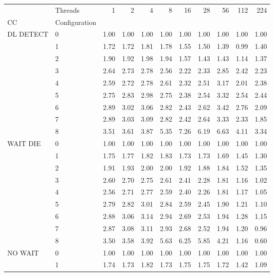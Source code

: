 \begin{tabular}{llrrrrrrrrr}
\toprule
       & Threads &  1   &  2   &  4   &  8   &  16  &  28  &  56  &  112 &  224 \\
CC & Configuration &      &      &      &      &      &      &      &      &      \\
\midrule
DL DETECT & 0 & 1.00 & 1.00 & 1.00 & 1.00 & 1.00 & 1.00 & 1.00 & 1.00 & 1.00 \\
       & 1 & 1.72 & 1.72 & 1.81 & 1.78 & 1.55 & 1.50 & 1.39 & 0.99 & 1.40 \\
       & 2 & 1.90 & 1.92 & 1.98 & 1.94 & 1.57 & 1.43 & 1.43 & 1.14 & 1.37 \\
       & 3 & 2.64 & 2.73 & 2.78 & 2.56 & 2.22 & 2.33 & 2.85 & 2.42 & 2.23 \\
       & 4 & 2.59 & 2.72 & 2.78 & 2.61 & 2.32 & 2.51 & 3.17 & 2.01 & 2.38 \\
       & 5 & 2.75 & 2.83 & 2.98 & 2.75 & 2.38 & 2.54 & 3.32 & 2.54 & 2.44 \\
       & 6 & 2.89 & 3.02 & 3.06 & 2.82 & 2.43 & 2.62 & 3.42 & 2.76 & 2.09 \\
       & 7 & 2.89 & 3.03 & 3.09 & 2.82 & 2.42 & 2.64 & 3.33 & 2.33 & 1.85 \\
       & 8 & 3.51 & 3.61 & 3.87 & 5.35 & 7.26 & 6.19 & 6.63 & 4.11 & 3.34 \\
WAIT DIE & 0 & 1.00 & 1.00 & 1.00 & 1.00 & 1.00 & 1.00 & 1.00 & 1.00 & 1.00 \\
       & 1 & 1.75 & 1.77 & 1.82 & 1.83 & 1.73 & 1.73 & 1.69 & 1.45 & 1.30 \\
       & 2 & 1.91 & 1.93 & 2.00 & 2.00 & 1.92 & 1.88 & 1.84 & 1.52 & 1.35 \\
       & 3 & 2.60 & 2.70 & 2.75 & 2.61 & 2.41 & 2.28 & 1.81 & 1.16 & 1.02 \\
       & 4 & 2.56 & 2.71 & 2.77 & 2.59 & 2.40 & 2.26 & 1.81 & 1.17 & 1.05 \\
       & 5 & 2.79 & 2.82 & 3.01 & 2.84 & 2.59 & 2.45 & 1.90 & 1.21 & 1.10 \\
       & 6 & 2.88 & 3.06 & 3.14 & 2.94 & 2.69 & 2.53 & 1.94 & 1.28 & 1.15 \\
       & 7 & 2.87 & 3.08 & 3.11 & 2.93 & 2.68 & 2.52 & 1.94 & 1.20 & 0.96 \\
       & 8 & 3.50 & 3.58 & 3.92 & 5.63 & 6.25 & 5.85 & 4.21 & 1.16 & 0.60 \\
NO WAIT & 0 & 1.00 & 1.00 & 1.00 & 1.00 & 1.00 & 1.00 & 1.00 & 1.00 & 1.00 \\
       & 1 & 1.74 & 1.73 & 1.82 & 1.73 & 1.75 & 1.75 & 1.72 & 1.42 & 1.09 \\

\end{tabular}

